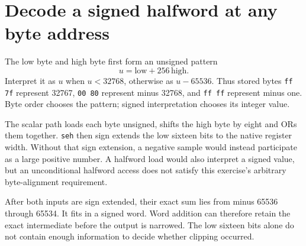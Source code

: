 \section{Decode a signed halfword at any byte address}\label{pcm-encoding}
The low byte and high byte first form an unsigned pattern
\[
  u=\text{low}+256\,\text{high}.
\]
Interpret it as $u$ when $u<32768$, otherwise as $u-65536$. Thus stored bytes
\texttt{ff 7f} represent 32767, \texttt{00 80} represent minus 32768, and
\texttt{ff ff} represent minus one. Byte order chooses the pattern; signed
interpretation chooses its integer value.

The scalar path loads each byte unsigned, shifts the high byte by eight and ORs
them together. \texttt{seh} then sign extends the low sixteen bits to the native
register width. Without that sign extension, a negative sample would instead
participate as a large positive number. A halfword load would also interpret a
signed value, but an unconditional halfword access does not satisfy this exercise's
arbitrary byte-alignment requirement.

After both inputs are sign extended, their exact sum lies from minus 65536 through
65534. It fits in a signed word. Word addition can therefore retain the exact
intermediate before the output is narrowed. The low sixteen bits alone do not
contain enough information to decide whether clipping occurred.
